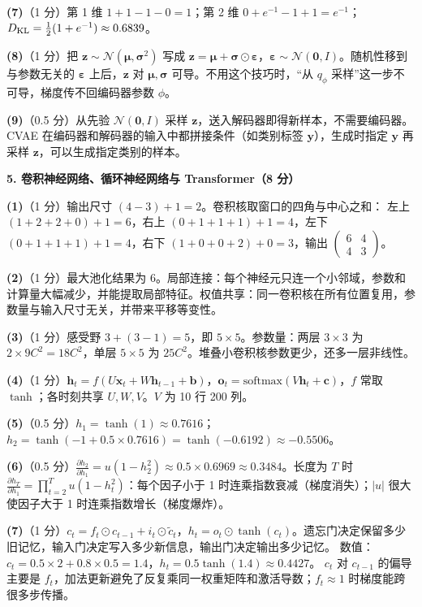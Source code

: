 \textbf{(7)}（1 分）第 1 维 $1+1-1-0=1$；第 2 维 $0+e^{-1}-1+1=e^{-1}$；$D_{\mathrm{KL}}=\frac12(1+e^{-1})\approx0.6839$。

\textbf{(8)}（1 分）把 $\bm z\sim\mathcal N(\bm\mu,\bm\sigma^2)$ 写成 $\bm z=\bm\mu+\bm\sigma\odot\bm\varepsilon$，$\bm\varepsilon\sim\mathcal N(\bm 0,I)$。随机性移到与参数无关的 $\bm\varepsilon$ 上后，$\bm z$ 对 $\bm\mu,\bm\sigma$ 可导。不用这个技巧时，“从 $q_\phi$ 采样”这一步不可导，梯度传不回编码器参数 $\phi$。

\textbf{(9)}（0.5 分）从先验 $\mathcal N(\bm 0,I)$ 采样 $\bm z$，送入解码器即得新样本，不需要编码器。CVAE 在编码器和解码器的输入中都拼接条件（如类别标签 $\bm y$），生成时指定 $\bm y$ 再采样 $\bm z$，可以生成指定类别的样本。

\medskip
\noindent\textbf{5. 卷积神经网络、循环神经网络与 Transformer（8 分）}

\textbf{(1)}（1 分）输出尺寸 $(4-3)+1=2$。卷积核取窗口的四角与中心之和：
左上 $(1+2+2+0)+1=6$，右上 $(0+1+1+1)+1=4$，左下 $(0+1+1+1)+1=4$，右下 $(1+0+0+2)+0=3$，输出 $\begin{pmatrix}6&4\\4&3\end{pmatrix}$。

\textbf{(2)}（1 分）最大池化结果为 $6$。局部连接：每个神经元只连一个小邻域，参数和计算量大幅减少，并能提取局部特征。权值共享：同一卷积核在所有位置复用，参数量与输入尺寸无关，并带来平移等变性。

\textbf{(3)}（1 分）感受野 $3+(3-1)=5$，即 $5\times5$。参数量：两层 $3\times3$ 为 $2\times9C^2=18C^2$，单层 $5\times5$ 为 $25C^2$。堆叠小卷积核参数更少，还多一层非线性。

\textbf{(4)}（1 分）$\bm h_t=f(U\bm x_t+W\bm h_{t-1}+\bm b)$，$\bm o_t=\mathrm{softmax}(V\bm h_t+\bm c)$，$f$ 常取 $\tanh$；各时刻共享 $U,W,V$。$V$ 为 10 行 200 列。

\textbf{(5)}（0.5 分）$h_1=\tanh(1)\approx0.7616$；$h_2=\tanh(-1+0.5\times0.7616)=\tanh(-0.6192)\approx-0.5506$。

\textbf{(6)}（0.5 分）$\frac{\partial h_2}{\partial h_1}=u(1-h_2^2)\approx0.5\times0.6969\approx0.3484$。长度为 $T$ 时 $\frac{\partial h_T}{\partial h_1}=\prod_{t=2}^{T}u(1-h_t^2)$：每个因子小于 1 时连乘指数衰减（梯度消失）；$|u|$ 很大使因子大于 1 时连乘指数增长（梯度爆炸）。

\textbf{(7)}（1 分）$c_t=f_t\odot c_{t-1}+i_t\odot\tilde c_t$，$h_t=o_t\odot\tanh(c_t)$。遗忘门决定保留多少旧记忆，输入门决定写入多少新信息，输出门决定输出多少记忆。
数值：$c_t=0.5\times2+0.8\times0.5=1.4$，$h_t=0.5\tanh(1.4)\approx0.4427$。
$c_t$ 对 $c_{t-1}$ 的偏导主要是 $f_t$，加法更新避免了反复乘同一权重矩阵和激活导数；$f_t\approx1$ 时梯度能跨很多步传播。

